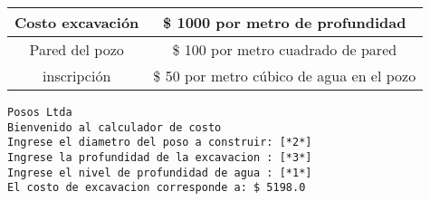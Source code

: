 \begin{enumerate}
    \begin{tabular}{c|c}
      \toprule
      Costo excavación & \$ 1000 por metro de profundidad \\
      \midrule
      Pared del pozo   & \$ 100 por metro cuadrado de pared \\
      \midrule
      inscripción      & \$ 50 por metro cúbico de agua en el pozo \\
    \bottomrule
    \end{tabular}

    \vspace*{\baselineskip}
    
    \begin{lstlisting}[style=consola]    
Posos Ltda
Bienvenido al calculador de costo
Ingrese el diametro del poso a construir: [*2*]
Ingrese la profundidad de la excavacion : [*3*]
Ingrese el nivel de profundidad de agua : [*1*]
El costo de excavacion corresponde a: $ 5198.0
    \end{lstlisting}
  \end{enumerate}